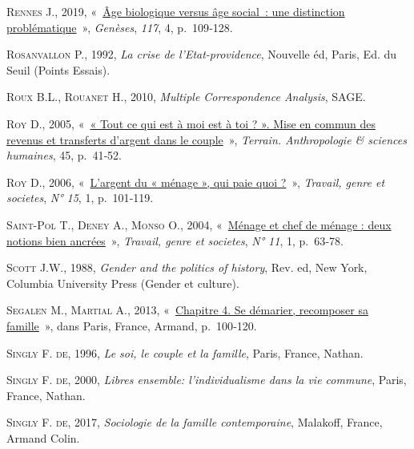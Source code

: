 \documentclass[
  12pt,
]{book}
\newlength{\cslhangindent}
\newenvironment{CSLReferences}[2] %
 {\begin{list}{}{%
  \setlength{\itemindent}{0pt}
  \setlength{\leftmargin}{0pt}
  \setlength{\parsep}{0pt}
  \ifodd #1
   \setlength{\leftmargin}{\cslhangindent}
   \setlength{\itemindent}{-1\cslhangindent}
  \fi
  \setlength{\itemsep}{#2\baselineskip}}}
 {\end{list}}
\begin{document}
\begin{CSLReferences}{0}{1}
\textsc{Rennes J.}, 2019,
{«~\href{https://doi.org/10.3917/gen.117.0109}{Âge biologique versus âge
social~: une distinction problématique}~»}, \emph{Genèses}, \emph{117},
4, p.~109‑128.

\textsc{Rosanvallon P.}, 1992, \emph{La crise de l'Etat-providence},
Nouvelle éd, Paris, Ed. du Seuil (Points Essais).

\textsc{Roux B.L.}, \textsc{Rouanet H.}, 2010, \emph{Multiple
Correspondence Analysis}, SAGE.

\textsc{Roy D.}, 2005, {«~\href{https://doi.org/10.4000/terrain.3530}{«
Tout ce qui est à moi est à toi ? ». Mise en commun des revenus et
transferts d{'}argent dans le couple}~»}, \emph{Terrain. Anthropologie
\& sciences humaines}, 45, p.~41‑52.

\textsc{Roy D.}, 2006,
{«~\href{http://www.cairn.info/revue-travail-genre-et-societes-2006-1-page-101.htm}{L'argent
du « ménage », qui paie quoi ?}~»}, \emph{Travail, genre et societes},
\emph{N° 15}, 1, p.~101‑119.

\textsc{Saint-Pol T.}, \textsc{Deney A.}, \textsc{Monso O.}, 2004,
{«~\href{https://www.cairn.info/revue-travail-genre-et-societes-2004-1-page-63.htm}{Ménage
et chef de ménage : deux notions bien ancrées}~»}, \emph{Travail, genre
et societes}, \emph{N° 11}, 1, p.~63‑78.

\textsc{Scott J.W.}, 1988, \emph{Gender and the politics of history},
Rev. ed, New York, Columbia University Press (Gender et culture).

\textsc{Segalen M.}, \textsc{Martial A.}, 2013,
{«~\href{http://www.cairn.info/sociologie-de-la-famille--9782200624743-page-100.htm}{Chapitre
4. Se démarier, recomposer sa famille}~»}, dans Paris, France, Armand,
p.~100‑120.

\textsc{Singly F. de}, 1996, \emph{Le soi, le couple et la famille},
Paris, France, Nathan.

\textsc{Singly F. de}, 2000, \emph{Libres ensemble: l'individualisme
dans la vie commune}, Paris, France, Nathan.

\textsc{Singly F. de}, 2017, \emph{Sociologie de la famille
contemporaine}, Malakoff, France, Armand Colin.


\end{CSLReferences}
\end{document}
